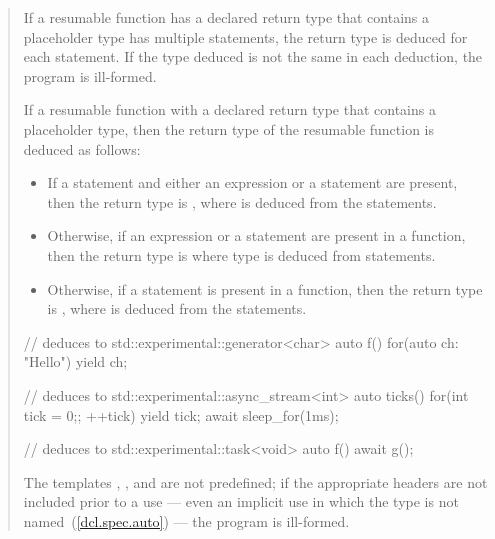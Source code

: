 \begin{quote}
\setcounter{Paras}{15}
\pnum
If a resumable function has a declared return type that contains a placeholder type has multiple  statements, the return type is deduced for each
 statement. If the type deduced is not the same in each
deduction, the program is ill-formed.

\pnum
If a resumable function with a declared return type that contains a placeholder type, then the return type of the resumable function is deduced as follows:

\begin{itemize}
\item If a  statement and either an  expression or a  statement are present, then
the return type is , where  is deduced from the  statements.

\item Otherwise, if an  expression or a  statement are present in a function, then
the return type is  where type  is deduced from 
 statements.

\item Otherwise, if a  statement is present in a function, then the return type is \linebreak
{},
where  is deduced from the  statements.

\end{itemize}
\enterexample
\begin{codeblock}
// deduces to std::experimental::generator<char>
auto f() { for(auto ch: "Hello") yield ch; }

// deduces to std::experimental::async_stream<int>
auto ticks() {
  for(int tick = 0;; ++tick) {
    yield tick;
    await sleep_for(1ms);
  }
}

// deduces to std::experimental::task<void>
auto f() {  await g(); }

\end{codeblock}
\exitexample

\pnum
The templates  , 
, and %
{} are not predefined;
if the appropriate headers are not included prior to a use --- even an implicit use in which the type is not
named~(\ref{dcl.spec.auto}) --- the program is ill-formed.
\end{quote}
